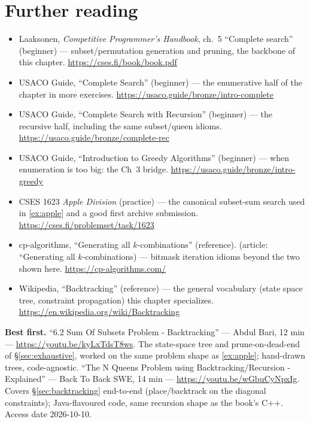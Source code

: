 \section*{Further reading}
\begin{itemize}
\item Laaksonen, \emph{Competitive Programmer's Handbook}, ch.~5
``Complete search'' (beginner) ---
subset/permutation generation and pruning, the backbone of this chapter. \newline\url{https://cses.fi/book/book.pdf}
\item USACO Guide, ``Complete Search'' (beginner) --- the enumerative half of
the chapter in more exercises. \newline\url{https://usaco.guide/bronze/intro-complete}
\item USACO Guide, ``Complete Search with Recursion'' (beginner) --- the recursive half,
including the same subset/queen idioms. \newline\url{https://usaco.guide/bronze/complete-rec}
\item USACO Guide, ``Introduction to Greedy Algorithms'' (beginner) --- when enumeration is too
big: the Ch~3 bridge. \newline\url{https://usaco.guide/bronze/intro-greedy}
\item CSES 1623 \emph{Apple Division} (practice) --- the canonical subset-sum
search used in \ref{ex:apple} and a good first archive submission. \newline\url{https://cses.fi/problemset/task/1623}
\item cp-algorithms, ``Generating all $k$-combinations'' (reference). (article: ``Generating all $k$-combinations)
--- bitmask iteration idioms beyond the two shown here. \newline\url{https://cp-algorithms.com/}
\item Wikipedia, ``Backtracking'' (reference) --- the general
vocabulary (state space tree, constraint propagation) this chapter
specializes. \newline\url{https://en.wikipedia.org/wiki/Backtracking}\end{itemize}

\begin{rulebox}
\smallskip\noindent\textbf{Best first.}
``6.2 Sum Of Subsets Problem - Backtracking'' --- Abdul Bari, 12 min ---
\url{https://youtu.be/kyLxTdsT8ws}. The state-space tree and
prune-on-dead-end of \S\ref{sec:exhaustive}, worked on the same problem
shape as \ref{ex:apple}; hand-drawn trees, code-agnostic.
\smallskip\noindent
``The N Queens Problem using Backtracking/Recursion - Explained'' ---
Back To Back SWE, 14 min ---
\url{https://youtu.be/wGbuCyNpxIg}. Covers
\S\ref{sec:backtracking} end-to-end (place/backtrack on the diagonal
constraints); Java-flavoured code, same recursion shape as the book's C++.
Access date 2026-10-10.
\end{rulebox}
